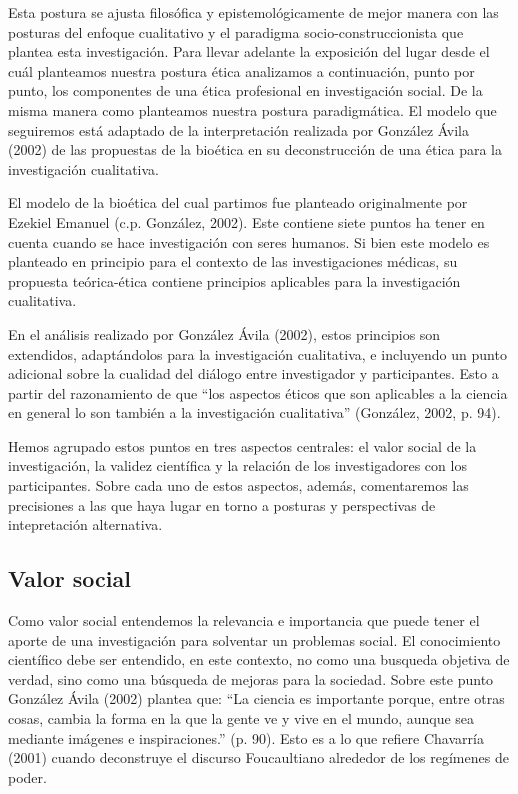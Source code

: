 Esta postura se ajusta filosófica y epistemológicamente de mejor manera con las
posturas del enfoque cualitativo y el paradigma socio-construccionista que
plantea esta investigación.
Para llevar adelante la exposición del lugar desde el cuál planteamos nuestra
postura ética analizamos a continuación, punto por punto, los componentes de
una ética profesional en investigación social.
De la misma manera como planteamos nuestra postura paradigmática.
El modelo que seguiremos está adaptado de la interpretación realizada por
González Ávila (2002) de las propuestas de la bioética en su deconstrucción de
una ética para la investigación cualitativa.

El modelo de la bioética del cual partimos fue planteado originalmente por
Ezekiel Emanuel (c.p. González, 2002).
Este contiene siete puntos ha tener en cuenta cuando se hace investigación
con seres humanos.
Si bien este modelo es planteado en principio para el contexto de las
investigaciones médicas, su propuesta teórica-ética contiene principios
aplicables para la investigación cualitativa.

En el análisis realizado por González Ávila (2002),
estos principios son extendidos, adaptándolos para la investigación
cualitativa, e incluyendo un punto adicional sobre la cualidad del diálogo entre
investigador y participantes.
Esto a partir del razonamiento de que “los aspectos éticos que son aplicables
a la ciencia en general lo son también a la investigación cualitativa”
(González, 2002, p. 94).

Hemos agrupado estos puntos en tres aspectos centrales: el valor social de la
investigación, la validez científica y la relación de los investigadores con
los participantes.
Sobre cada uno de estos aspectos, además, comentaremos las precisiones a las
que haya lugar en torno a posturas y perspectivas de intepretación alternativa.

\subsection{Valor social}
Como valor social entendemos la relevancia e importancia que puede tener el
aporte de una investigación para solventar un problemas social.
El conocimiento científico debe ser entendido, en este contexto, no como
una busqueda objetiva de verdad, sino como una búsqueda de mejoras para la
sociedad.
Sobre este punto González Ávila (2002) plantea que: “La ciencia es importante
porque, entre otras cosas, cambia la forma en la que la gente ve y vive en el
mundo, aunque sea mediante imágenes e inspiraciones.” (p. 90).
Esto es a lo que refiere Chavarría (2001) cuando deconstruye el discurso
Foucaultiano alrededor de los regímenes de poder.


